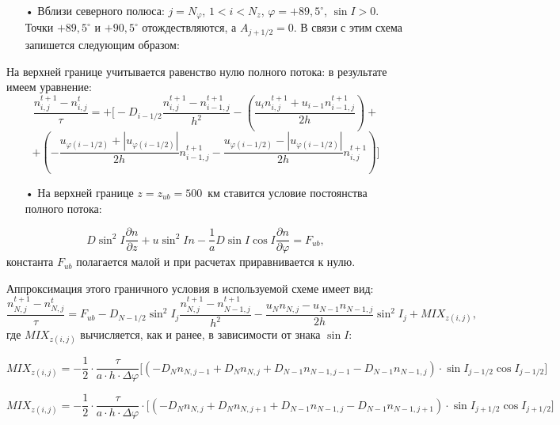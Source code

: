 \documentclass[2pt, a4paper, fleqn]{extarticle}
\let\geq\geqslant
\begin{document}
\begin{itemize}
\item[•] Вблизи северного полюса: $j = N_{\varphi}$, $1<i<N_z$, $\varphi = +89{,}5^\circ$, $\sin I > 0$. Точки $+89{,}5^\circ$ и $+90{,}5^\circ$ отождествляются, а $A_{j+1/2} = 0$. В связи с этим схема запишется следующим образом: 
\end{itemize}

На верхней границе учитывается равенство нулю полного потока: в результате имеем уравнение: 
$$\dfrac{n_{i,j}^{t+1}-n_{i,j}^t}{\tau} = + \bigg[-D_{i-1/2}\dfrac{n_{i,j}^{t+1}-n_{i-1,j}^{t+1}}{h^2}-\left(\dfrac{u_{i}n_{i,j}^{t+1}+u_{i-1}n_{i-1,j}^{t+1}}{2h}\right) +$$ $$+ \left(-\dfrac{u_{\varphi(i-1/2)}+|u_{\varphi(i-1/2)}|}{2h}n_{i-1,j}^{t+1}-\dfrac{u_{\varphi(i-1/2)}-|u_{\varphi(i-1/2)}|}{2h} n_{i,j}^{t+1}\right) \bigg]$$

\begin{itemize}
\item[•] На верхней границе $z = z_{ub} = 500$~км ставится условие постоянства полного потока:
\end{itemize}
 $$D\sin^2 I\dfrac{\partial n}{\partial z} + u\sin^2 I n - \dfrac{1}{a}D\sin I \cos I \dfrac{\partial n}{\partial \varphi} = F_{ub},$$ константа $F_{ub}$ полагается малой и при расчетах приравнивается к нулю.

Аппроксимация этого граничного условия в используемой схеме имеет вид:
$$\dfrac{n_{N,j}^{t+1}-n_{N, j}^t}{\tau} =F_{ub} -D_{N-1/2}\sin^2I_j\dfrac{n_{N, j}^{t+1} - n_{N-1, j}^{t+1}}{h^2} - \dfrac{u_N n_{N, j}-u_{N-1}n_{N-1, j}}{2h}\sin^2I_j +MIX_{z(i, j)},$$
где $MIX_{z(i, j)}$ вычисляется, как и ранее, в зависимости от знака $\sin I$: 

\begin{center}
\fbox{При $\sin I \geq 0$:}
\end{center}

$$MIX_{z(i, j)} = -\dfrac{1}{2}\cdot\dfrac{\tau}{a\cdot h\cdot \Delta\varphi}\bigg[(-D_N n_{N, j-1} + D_N n_{N, j} + D_{N-1} n_{N-1, j-1} - D_{N-1} n_{N-1, j})\cdot \sin I_{j-1/2}\cos I_{j-1/2}\bigg]$$


\begin{center}
\end{center}

$$MIX_{z(i, j)} = -\dfrac{1}{2}\cdot\dfrac{\tau}{a\cdot h\cdot \Delta\varphi}\cdot\bigg[(-D_N n_{N, j} + D_N n_{N, j+1} + D_{N-1} n_{N-1, j} - D_{N-1} n_{N-1, j+1})\cdot \sin I_{j+1/2}\cos I_{j+1/2}\bigg]$$
\end{document}
